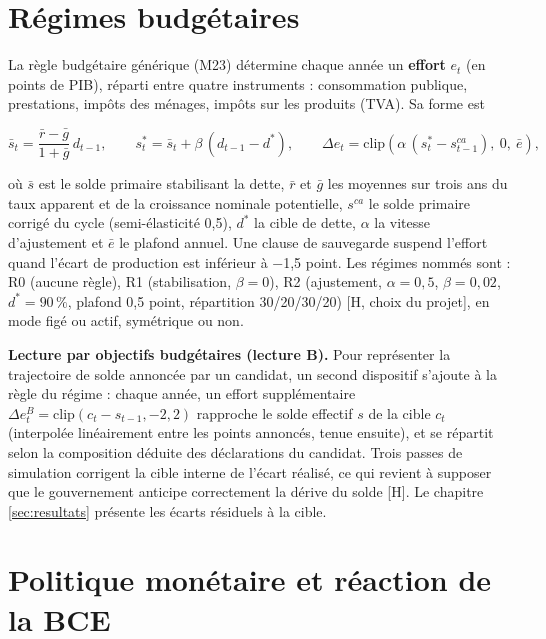 \documentclass[
  11pt,
  11pt,
  a4paper,
  openany]{book}
\begin{document}
\hypertarget{sec:regimes-budgetaires}{%
\section{Régimes budgétaires}\label{sec:regimes-budgetaires}}

La règle budgétaire générique (M23) détermine chaque année un
\textbf{effort} \(e_t\) (en points de PIB), réparti entre quatre
instruments : consommation publique, prestations, impôts des ménages,
impôts sur les produits (TVA). Sa forme est

\[\bar s_t = \frac{\bar r - \bar g}{1 + \bar g}\,d_{t-1}, \qquad s^*_t = \bar s_t + \beta\,(d_{t-1} - d^*), \qquad
\Delta e_t = \text{clip}\left(\alpha\,(s^*_t - s^{ca}_{t-1}),\ 0,\ \bar e\right),\]

où \(\bar s\) est le solde primaire stabilisant la dette, \(\bar r\) et
\(\bar g\) les moyennes sur trois ans du taux apparent et de la
croissance nominale potentielle, \(s^{ca}\) le solde primaire corrigé du
cycle (semi-élasticité 0,5), \(d^*\) la cible de dette, \(\alpha\) la
vitesse d'ajustement et \(\bar e\) le plafond annuel. Une clause de
sauvegarde suspend l'effort quand l'écart de production est inférieur à
−1,5 point. Les régimes nommés sont : R0 (aucune règle), R1
(stabilisation, \(\beta = 0\)), R2 (ajustement, \(\alpha = 0{,}5\),
\(\beta = 0{,}02\), \(d^* = 90\,\%\), plafond 0,5 point, répartition
30/20/30/20) {[}H, choix du projet{]}, en mode figé ou actif, symétrique
ou non.

\textbf{Lecture par objectifs budgétaires (lecture B).} Pour représenter
la trajectoire de solde annoncée par un candidat, un second dispositif
s'ajoute à la règle du régime : chaque année, un effort supplémentaire
\(\Delta e^B_t = \text{clip}\left(c_t - s_{t-1}, -2, 2\right)\)
rapproche le solde effectif \(s\) de la cible \(c_t\) (interpolée
linéairement entre les points annoncés, tenue ensuite), et se répartit
selon la composition déduite des déclarations du candidat. Trois passes
de simulation corrigent la cible interne de l'écart réalisé, ce qui
revient à supposer que le gouvernement anticipe correctement la dérive
du solde {[}H{]}. Le chapitre \ref{sec:resultats} présente les écarts
résiduels à la cible.

\hypertarget{sec:bce}{%
\section{Politique monétaire et réaction de la BCE}\label{sec:bce}}
\end{document}
